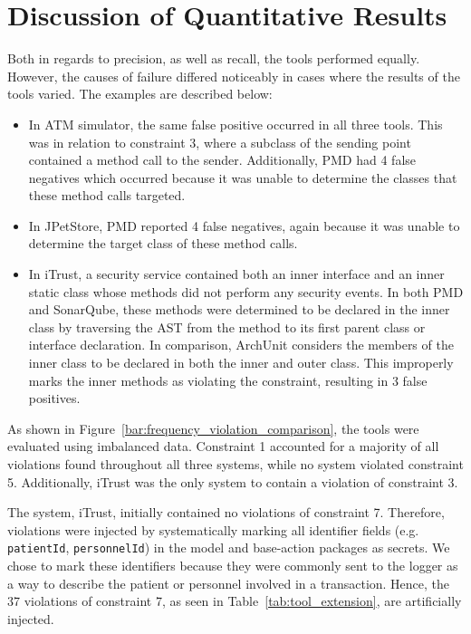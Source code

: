 \section{Discussion of Quantitative Results}
Both in regards to precision, as well as recall, the tools performed equally. However, the causes of failure differed noticeably in cases where the results of the tools varied. The examples are described below:

\begin{itemize}
    \item In ATM simulator, the same false positive occurred in all three tools. This was in relation to constraint 3, where a subclass of the sending point contained a method call to the sender. Additionally, PMD had 4 false negatives which occurred because it was unable to determine the classes that these method calls targeted.
    \item In JPetStore, PMD reported 4 false negatives, again because it was unable to determine the target class of these method calls.
    \item In iTrust, a security service contained both an inner interface and an inner static class whose methods did not perform any security events. In both PMD and SonarQube, these methods were determined to be declared in the inner class by traversing the AST from the method to its first parent class or interface declaration. In comparison, ArchUnit considers the members of the inner class to be declared in both the inner and outer class. This improperly marks the inner methods as violating the constraint, resulting in 3 false positives.
\end{itemize}

As shown in Figure~\ref{bar:frequency_violation_comparison}, the tools were evaluated using imbalanced data. Constraint 1 accounted for a majority of all violations found throughout all three systems, while no system violated constraint 5. Additionally, iTrust was the only system to contain a violation of constraint 3. 

The system, iTrust, initially contained no violations of constraint 7. Therefore, violations were injected by systematically marking all identifier fields (e.g. \texttt{patientId}, \texttt{personnelId}) in the model and base-action packages as secrets. We chose to mark these identifiers because they were commonly sent to the logger as a way to describe the patient or personnel involved in a transaction. Hence, the 37 violations of constraint 7, as seen in Table~\ref{tab:tool_extension}, are artificially injected.

